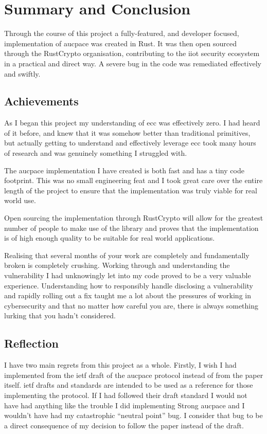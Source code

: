 \chapter{Summary and Conclusion}
\label{chap:conclusion}

Through the course of this project a fully-featured, and developer focused, implementation of \gls{aucpace} was created in Rust.
It was then open sourced through the RustCrypto organisation, contributing to the \gls{iiot} security ecosystem in a practical and direct way.
A severe bug in the code was remediated effectively and swiftly.

\section{Achievements}
As I began this project my understanding of \gls{ecc} was effectively zero.
I had heard of it before, and knew that it was somehow better than traditional primitives, but actually getting to understand and effectively leverage \gls{ecc} took many hours of research and was genuinely something I struggled with.

The \gls{aucpace} implementation I have created is both fast and has a tiny code footprint.
This was no small engineering feat and I took great care over the entire length of the project to ensure that the implementation was truly viable for real world use.

Open sourcing the implementation through RustCrypto will allow for the greatest number of people to make use of the library and proves that the implementation is of high enough quality to be suitable for real world applications.

Realising that several months of your work are completely and fundamentally broken is completely crushing.
Working through and understanding the vulnerability I had unknowingly let into my code proved to be a very valuable experience.
Understanding how to responsibly handle disclosing a vulnerability and rapidly rolling out a fix taught me a lot about the pressures of working in cybersecurity and that no matter how careful you are, there is always something lurking that you hadn't considered.

\section{Reflection}
I have two main regrets from this project as a whole.
Firstly, I wish I had implemented from the \gls{ietf} draft of the \gls{aucpace} protocol instead of from the paper itself.
\gls{ietf} drafts and standards are intended to be used as a reference for those implementing the protocol.
If I had followed their draft standard I would not have had anything like the trouble I did implementing Strong \gls{aucpace} and I wouldn't have had my catastrophic \enquote{neutral point} bug.
I consider that bug to be a direct consequence of my decision to follow the paper instead of the draft.

